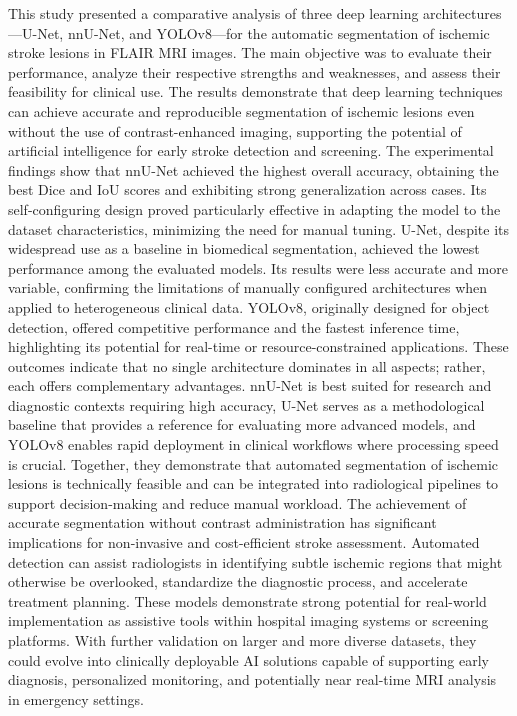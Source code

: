 \documentclass[12pt]{article}
\begin{document}
This study presented a comparative analysis of three deep learning architectures—U-Net, nnU-Net, and YOLOv8—for the automatic segmentation of ischemic stroke lesions in FLAIR MRI images. The main objective was to evaluate their performance, analyze their respective strengths and weaknesses, and assess their feasibility for clinical use. The results demonstrate that deep learning techniques can achieve accurate and reproducible segmentation of ischemic lesions even without the use of contrast-enhanced imaging, supporting the potential of artificial intelligence for early stroke detection and screening.
%
The experimental findings show that nnU-Net achieved the highest overall accuracy, obtaining the best Dice and IoU scores and exhibiting strong generalization across cases. Its self-configuring design proved particularly effective in adapting the model to the dataset characteristics, minimizing the need for manual tuning. U-Net, despite its widespread use as a baseline in biomedical segmentation, achieved the lowest performance among the evaluated models. Its results were less accurate and more variable, confirming the limitations of manually configured architectures when applied to heterogeneous clinical data. YOLOv8, originally designed for object detection, offered competitive performance and the fastest inference time, highlighting its potential for real-time or resource-constrained applications.
%
These outcomes indicate that no single architecture dominates in all aspects; rather, each offers complementary advantages. nnU-Net is best suited for research and diagnostic contexts requiring high accuracy, U-Net serves as a methodological baseline that provides a reference for evaluating more advanced models, and YOLOv8 enables rapid deployment in clinical workflows where processing speed is crucial. Together, they demonstrate that automated segmentation of ischemic lesions is technically feasible and can be integrated into radiological pipelines to support decision-making and reduce manual workload.
%
The achievement of accurate segmentation without contrast administration has significant implications for non-invasive and cost-efficient stroke assessment. Automated detection can assist radiologists in identifying subtle ischemic regions that might otherwise be overlooked, standardize the diagnostic process, and accelerate treatment planning. These models demonstrate strong potential for real-world implementation as assistive tools within hospital imaging systems or screening platforms. With further validation on larger and more diverse datasets, they could evolve into clinically deployable AI solutions capable of supporting early diagnosis, personalized monitoring, and potentially near real-time MRI analysis in emergency settings.
\end{document}
